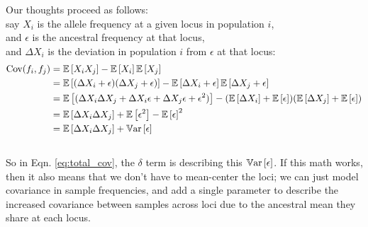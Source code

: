 \documentclass[12pt]{article}
\newcommand{\e}[1]{{\mathbb E}\left[ #1 \right]}
\newcommand{\var}[1]{{\mathbb V \textnormal{ar}}\left[ #1 \right]}
\begin{document}
Our thoughts proceed as follows:\\
say $X_i$ is the allele frequency at a given locus in population $i$,\\
and $\epsilon$ is the ancestral frequency at that locus,\\
and $\Delta X_i$ is the deviation in population $i$ from $\epsilon$ at that locus:\\
\begin{align}
\text{Cov}(f_i,f_j) &= \e{X_iX_j} - \e{X_i}\e{X_j}	\notag\\
			&= \e{(\Delta X_i + \epsilon) (\Delta X_j +
                          \epsilon)} - \e{ \Delta X_i+ \epsilon}\e{\Delta X_j+ \epsilon} \notag\\
			&= \e{(\Delta X_i \Delta X_j + \Delta X_i\epsilon + \Delta X_j\epsilon + \epsilon^2)} -(\e{\Delta X_i}+ \e{\epsilon})(\e{\Delta X_j}+ \e{\epsilon}) \notag\\
			&= \e{\Delta X_i \Delta X_j}  + \e{\epsilon^2} - \e{\epsilon}^2 \notag\\
			&= \e{\Delta X_i \Delta X_j}  + \var{\epsilon}
\end{align}
\\
So in Eqn. \eqref{eq:total_cov}, the $\delta$ term is describing this $\var{\epsilon}$.
If this math works, then it also means that we don't have to mean-center the loci;
we can just model covariance in sample frequencies, 
and add a single parameter to describe the increased covariance between samples across loci 
due to the ancestral mean they share at each locus.
\end{document}
